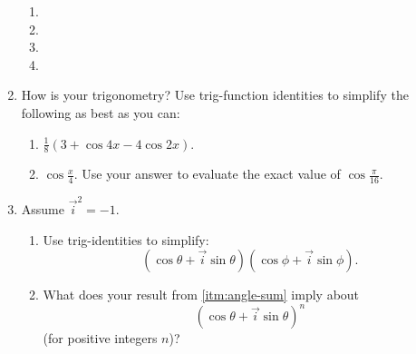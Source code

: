 \documentclass{ks}
\begin{document}
\begin{enumerate}
    \begin{multicols}{2}
      \begin{enumerate}
        \item {}
        \item {}
        \item {}
        \item {}
      \end{enumerate}
    \end{multicols}

  \item How is your trigonometry?  Use trig-function identities to simplify the
    following as best as you can:

    \begin{enumerate}
      \item \(\frac 1 8 (3 + \cos 4x - 4 \cos 2x)\).
      \item \(\cos \frac x 4\).  Use your answer to evaluate the exact value of
        \(\cos \frac \pi {16}\).
    \end{enumerate}

  \item Assume \(\vec i^2 = -1\).
    \begin{enumerate}
      \item \label{itm:angle-sum} Use trig-identities to simplify:
        \[
          (\cos \theta + \vec i \sin \theta) (\cos \phi + \vec i \sin \phi).
        \]
      \item What does your result from \ref{itm:angle-sum} imply about
        \[
          (\cos \theta + \vec i \sin \theta)^n
        \]
        (for positive integers \(n\))?
    \end{enumerate}




\end{enumerate}
\end{document}

